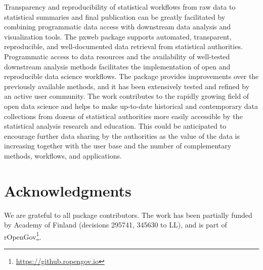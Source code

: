 
Transparency and reproducibility of statistical workflows from raw
data to statistical summaries and final publication can be greatly
facilitated by combining programmatic data access with downstream data
analysis and visualization tools. The pxweb package supports
automated, transparent, reproducible, and well-documented data
retrieval from statistical authorities. Programmatic access to data
resources and the availability of well-tested downstream analysis
methods facilitates the implementation of open and reproducible data
science workflows. The  package provides improvements
over the previously available methods, and it has been extensively
tested and refined by an active user community. The work contributes
to the rapidly growing field of open data science \cite{Lahti2018IDA,
xxx} and helps to make up-to-date historical and contemporary data
collections from dozens of statistical authorities more easily
accessible by the statistical analysis research and education. This
could be anticipated to encourage further data sharing by the
authorities as the value of the data is increasing together with the
user base and the number of complementary methods, workflows, and
applications.



\section*{Acknowledgments}

We are grateful to all package contributors. The work has been
partially funded by Academy of Finland (decisions 295741, 345630 to
LL), and is part of
rOpenGov\footnote{\url{https://github.ropengov.io}}.






\address{M\r{a}ns Magnusson\\
  Department of Computer Science\\
  Aalto University\\
  Finland\\}


\address{Leo Lahti\\
  Department of Computing\\
  PO Box 20014 University of Turku\\
  Finland\\}
